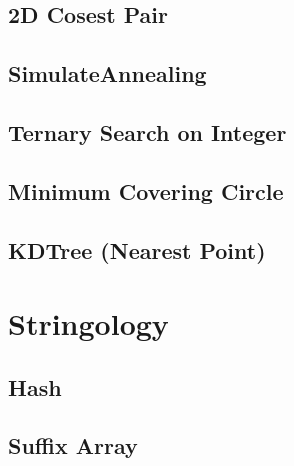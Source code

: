 \documentclass[a4paper,10pt,twocolumn,oneside]{article}
\begin{document}
\subsection{2D Cosest Pair}

\subsection{SimulateAnnealing}

\subsection{Ternary Search on Integer}

%
\subsection{Minimum Covering Circle}

\subsection{KDTree (Nearest Point)}

%
%

\section{Stringology}
\subsection{Hash}

\subsection{Suffix Array}

%
\end{document}
